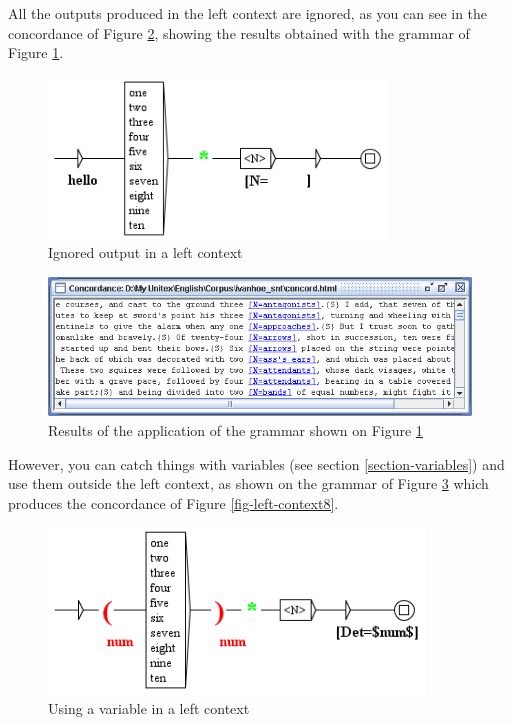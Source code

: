 \clearpage
\noindent All the outputs produced in the left context are ignored, as you can
see in the concordance of Figure \ref{fig-left-context6}, showing the results
obtained with the grammar of Figure \ref{fig-left-context5}.

\begin{figure}[!ht]
\begin{center}
\includegraphics[width=9cm]{resources/img/fig6-17e.png}
\caption{Ignored output in a left context\label{fig-left-context5}}
\end{center}
\end{figure}

\begin{figure}[!ht]
\begin{center}
\includegraphics[width=15cm]{resources/img/fig6-17f.png}
\caption{Results of the application of the grammar shown on Figure
\ref{fig-left-context5}\label{fig-left-context6}}
\end{center}
\end{figure}

\bigskip
\noindent However, you can catch things with variables (see section
\ref{section-variables}) and use them outside the left context, as shown on the
grammar of Figure \ref{fig-left-context7} which produces the concordance of Figure \ref{fig-left-context8}.

\begin{figure}[!ht]
\begin{center}
\includegraphics[width=10cm]{resources/img/fig6-17g.png}
\caption{Using a variable in a left context\label{fig-left-context7}}
\end{center}
\end{figure}


